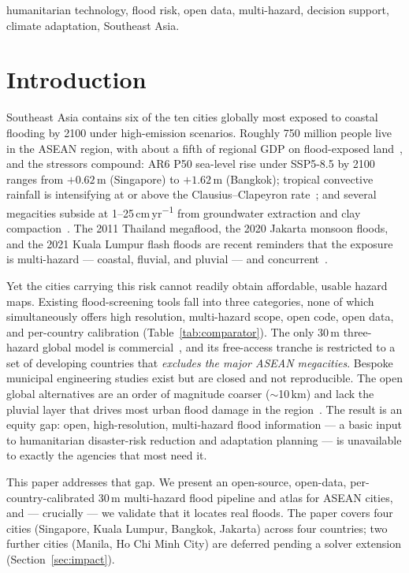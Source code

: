 \documentclass[conference]{IEEEtran}
\begin{document}
\begin{IEEEkeywords}
humanitarian technology, flood risk, open data, multi-hazard, decision support,
climate adaptation, Southeast Asia.
\end{IEEEkeywords}

\section{Introduction}
Southeast Asia contains six of the ten cities globally most exposed to coastal
flooding by 2100 under high-emission scenarios. Roughly 750 million people live in
the ASEAN region, with about a fifth of regional GDP on flood-exposed
land~\cite{ref_adb}, and the
stressors compound: AR6 P50 sea-level rise under SSP5-8.5 by 2100 ranges from
$+0.62$\,m (Singapore) to $+1.62$\,m (Bangkok); tropical convective rainfall is
intensifying at or above the Clausius--Clapeyron rate~\cite{ref_lenderink}; and
several megacities subside
at 1--25\,cm\,yr\textsuperscript{$-1$} from groundwater extraction and clay
compaction~\cite{ref_abidin,ref_phienwej,ref_chaussard}. The 2011 Thailand megaflood,
the 2020 Jakarta monsoon floods, and the 2021 Kuala Lumpur flash floods are recent
reminders that the exposure is multi-hazard --- coastal, fluvial, and pluvial --- and
concurrent~\cite{ref_hallegatte,ref_tellman}.

Yet the cities carrying this risk cannot readily obtain affordable, usable hazard
maps. Existing flood-screening tools fall into three categories, none of which
simultaneously offers high resolution, multi-hazard scope, open code, open data, and
per-country calibration (Table~\ref{tab:comparator}). The only 30\,m three-hazard
global model is commercial~\cite{ref_fathom}, and its free-access tranche is
restricted to a set of developing countries that \emph{excludes the major ASEAN
megacities}. Bespoke municipal engineering studies exist but are closed and not
reproducible. The open global alternatives are an order of magnitude coarser
($\sim$10\,km) and lack the pluvial layer that drives most urban flood damage in the
region~\cite{ref_hofste,ref_ward,ref_sutanudjaja}. The result is an equity gap: open,
high-resolution, multi-hazard flood information --- a basic input to humanitarian
disaster-risk reduction and adaptation planning --- is unavailable to exactly the
agencies that most need it.

This paper addresses that gap. We present an open-source, open-data,
per-country-calibrated 30\,m multi-hazard flood pipeline and atlas for ASEAN cities,
and --- crucially --- we validate that it locates real floods. The paper covers four
cities (Singapore, Kuala Lumpur, Bangkok, Jakarta) across four countries; two further
cities (Manila, Ho Chi Minh City) are deferred pending a solver extension
(Section~\ref{sec:impact}).
\end{document}
